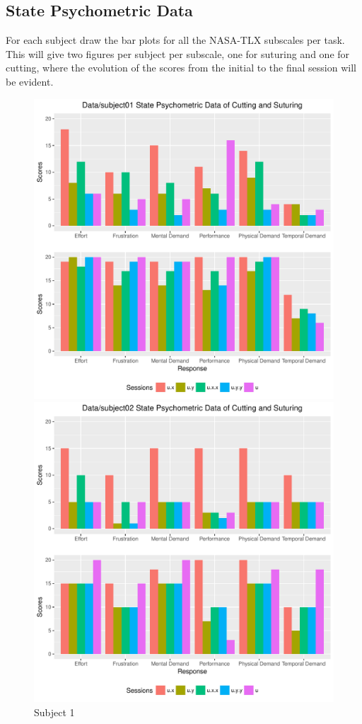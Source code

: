 \documentclass[12pt,epsf]{report}
\begin{document}
\subsection*{State Psychometric Data}
For each subject draw the bar plots for all the NASA-TLX subscales per task. This will give two figures per subject per subscale, one for suturing and one for cutting, where the evolution of the scores from the initial to the final session will be evident. \\
\begin{figure}[!htb]
	\begin{minipage}[c]{0.5\linewidth}
	\includegraphics[width=\linewidth]{subject01_State_Psychometry.pdf}
	\caption{Subject 1 }
	\end{minipage}
	\hfill
	\begin{minipage}[c]{0.5\linewidth}
	\includegraphics[width=\linewidth]{subject02_State_Psychometry.pdf}

\end{minipage}
\end{figure}
\end{document}
